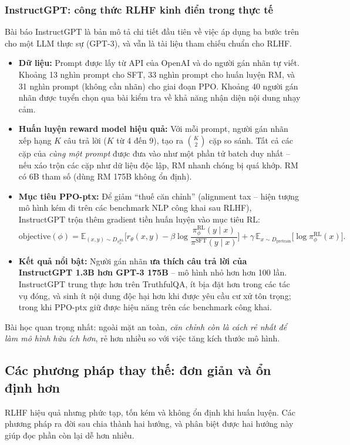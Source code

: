 \subsubsection{InstructGPT: công thức RLHF kinh điển trong thực tế}
\label{sssec:instructgpt}
Bài báo InstructGPT \cite{ouyang2022training} là bản mô tả chi tiết đầu tiên về việc áp dụng ba bước trên cho một LLM thực sự (GPT-3), và vẫn là tài liệu tham chiếu chuẩn cho RLHF.
\begin{itemize}
	\item \textbf{Dữ liệu:} Prompt được lấy từ API của OpenAI và do người gán nhãn tự viết. Khoảng 13 nghìn prompt cho SFT, 33 nghìn prompt cho huấn luyện RM, và 31 nghìn prompt (không cần nhãn) cho giai đoạn PPO. Khoảng 40 người gán nhãn được tuyển chọn qua bài kiểm tra về khả năng nhận diện nội dung nhạy cảm.
	\item \textbf{Huấn luyện reward model hiệu quả:} Với mỗi prompt, người gán nhãn xếp hạng $K$ câu trả lời ($K$ từ 4 đến 9), tạo ra $\binom{K}{2}$ cặp so sánh. Tất cả các cặp của \emph{cùng một prompt} được đưa vào như một phần tử batch duy nhất -- nếu xáo trộn các cặp như dữ liệu độc lập, RM nhanh chóng bị quá khớp. RM có 6B tham số (dùng RM 175B không ổn định).
	\item \textbf{Mục tiêu PPO-ptx:} Để giảm “thuế căn chỉnh” (alignment tax -- hiện tượng mô hình kém đi trên các benchmark NLP công khai sau RLHF), InstructGPT trộn thêm gradient tiền huấn luyện vào mục tiêu RL:
	\[
	\text{objective}(\phi) = \mathbb{E}_{(x,y)\sim D_{\pi_\phi^{\text{RL}}}}\Big[r_\theta(x,y) - \beta \log\frac{\pi_\phi^{\text{RL}}(y\mid x)}{\pi^{\text{SFT}}(y\mid x)}\Big] + \gamma\, \mathbb{E}_{x\sim D_{\text{pretrain}}}\Big[\log \pi_\phi^{\text{RL}}(x)\Big].
	\]
	\item \textbf{Kết quả nổi bật:} Người gán nhãn \textbf{ưa thích câu trả lời của InstructGPT 1.3B hơn GPT-3 175B} -- mô hình nhỏ hơn hơn 100 lần. InstructGPT trung thực hơn trên TruthfulQA, ít bịa đặt hơn trong các tác vụ đóng, và sinh ít nội dung độc hại hơn khi được yêu cầu cư xử tôn trọng; trong khi PPO-ptx giữ được hiệu năng trên các benchmark công khai.
\end{itemize}
Bài học quan trọng nhất: ngoài mặt an toàn, \emph{căn chỉnh còn là cách rẻ nhất để làm mô hình hữu ích hơn}, rẻ hơn nhiều so với việc tăng kích thước mô hình.

\subsection{Các phương pháp thay thế: đơn giản và ổn định hơn}
\label{ssec:rlhf_alternatives}
RLHF hiệu quả nhưng phức tạp, tốn kém và không ổn định khi huấn luyện. Các phương pháp ra đời sau chia thành hai hướng, và phân biệt được hai hướng này giúp đọc phần còn lại dễ hơn nhiều.

